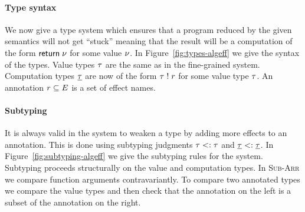 {\paragraph{Type syntax}
We now give a type system which ensures that a program reduced by the given semantics will not get ``stuck'' meaning that the result will be a computation of the form $\mathsf{return} \; \nu$ for some value $\nu$.
In Figure~\ref{fig:types-algeff} we give the syntax of the types.
Value types $\tau$ are the same as in the fine-grained system.
Computation types $\underline{\tau}$ are now of the form $\tau \; ! \; r$ for some value type $\tau$.
An annotation $r \subseteq E$ is a set of effect names.

\paragraph{Subtyping}
It is always valid in the system to weaken a type by adding more effects to an annotation.
This is done using subtyping judgments $\tau <: \tau$ and $\underline{\tau} <: \underline{\tau}$.
In Figure~\ref{fig:subtyping-algeff} we give the subtyping rules for the system.
Subtyping proceeds structurally on the value and computation types.
In \textsc{Sub-Arr} we compare function arguments contravariantly.
To compare two annotated types we compare the value types and then check that the annotation on the left is a subset of the annotation on the right.

}
